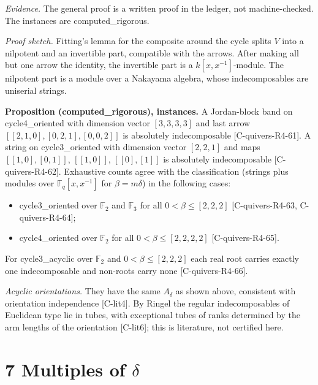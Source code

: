\documentclass[10pt,twocolumn]{article}
\begin{document}
\emph{Evidence.} The general proof is a written proof in the ledger, not machine-checked. The instances are computed\_rigorous.

\emph{Proof sketch.} Fitting's lemma for the composite around the cycle splits $V$ into a nilpotent and an invertible part, compatible with the arrows. After making all but one arrow the identity, the invertible part is a $k[x,x^{-1}]$-module. The nilpotent part is a module over a Nakayama algebra, whose indecomposables are uniserial strings.

\textbf{Proposition (computed\_rigorous), instances.} A Jordan-block band on cycle4\_oriented with dimension vector $[3, 3, 3, 3]$ and last arrow $[[2, 1, 0], [0, 2, 1], [0, 0, 2]]$ is absolutely indecomposable {\scriptsize[C-quivers-R4-61]}. A string on cycle3\_oriented with dimension vector $[2, 2, 1]$ and maps $[[1, 0], [0, 1]]$, $[[1, 0]]$, $[[0], [1]]$ is absolutely indecomposable {\scriptsize[C-quivers-R4-62]}. Exhaustive counts agree with the classification (strings plus modules over $\mathbb F_q[x,x^{-1}]$ for $\beta=m\delta$) in the following cases:
\begin{itemize}
\item cycle3\_oriented over $\mathbb F_2$ and $\mathbb F_3$ for all $0<\beta\le[2, 2, 2]$ {\scriptsize[C-quivers-R4-63, C-quivers-R4-64]};
\item cycle4\_oriented over $\mathbb F_2$ for all $0<\beta\le[2, 2, 2, 2]$ {\scriptsize[C-quivers-R4-65]}.
\end{itemize}

For cycle3\_acyclic over $\mathbb F_2$ and $0<\beta\le[2, 2, 2]$ each real root carries exactly one indecomposable and non-roots carry none {\scriptsize[C-quivers-R4-66]}.

\emph{Acyclic orientations.} They have the same $A_\delta$ as shown above, consistent with orientation independence {\scriptsize[C-lit4]}. By Ringel the regular indecomposables of Euclidean type lie in tubes, with exceptional tubes of ranks determined by the arm lengths of the orientation {\scriptsize[C-lit6]}; this is literature, not certified here.

\section*{7 Multiples of $\delta$}
\end{document}
